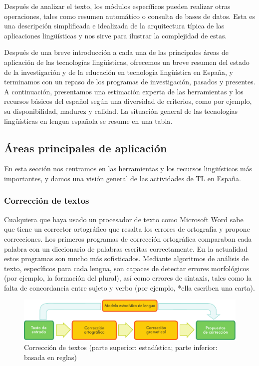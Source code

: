 \begin{multicols}{2}
Después de analizar el texto, los módulos específicos pueden realizar otras operaciones, tales como resumen automático o consulta de bases de datos. Esta es una descripción simplificada e idealizada de la arquitectura típica de las aplicaciones lingüísticas y nos sirve para ilustrar la complejidad de estas.

Después de una breve introducción a cada una de las principales áreas de aplicación de las tecnologías lingüísticas, ofrecemos un breve resumen del estado de la investigación y de la educación en tecnología lingüística en España, y terminamos con un repaso de los programas de investigación, pasados y presentes. A continuación, presentamos una estimación experta de las herramientas y los recursos básicos del español según una diversidad de criterios, como por ejemplo, su disponibilidad, madurez y calidad. La situación general de las tecnologías lingüísticas en lengua española se resume en una tabla.

\subsection{Áreas principales de aplicación} 

En esta sección nos centramos en las herramientas y los recursos lingüísticos más importantes, y damos una visión general de las actividades de TL en España. 

\subsubsection{Corrección de textos}

Cualquiera que haya usado un procesador de texto como Microsoft Word sabe que tiene un corrector ortográfico que resalta los errores de ortografía y propone correcciones. Los primeros programas de corrección ortográfica comparaban cada palabra con un diccionario de palabras escritas correctamente. En la actualidad estos programas son mucho más sofisticados. Mediante algoritmos de análisis de texto, específicos para cada lengua, son capaces de detectar errores morfológicos (por ejemplo, la formación del plural), así como errores de sintaxis, tales como la falta de concordancia entre sujeto y verbo (por ejemplo, *ella escriben una carta). 

\begin{figure}[htb]
  \center
  \includegraphics[width=\textwidth]{../_media/spanish/language_checking}
  \caption{Corrección de textos (parte superior: estadística; parte inferior: basada en reglas)}
  \label{fig:langcheckingaarch_de}
\end{figure}


\end{multicols}

